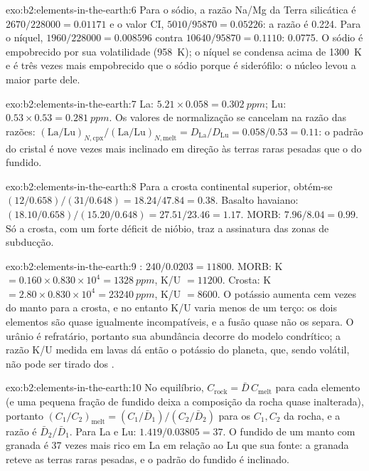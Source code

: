 \begin{solution}{exo:b2:elements-in-the-earth:6}
Para o sódio, a razão Na/Mg da Terra silicática é $2670/\num{228000} = 0.01171$ e o valor
CI, $5010/\num{95870} = 0.05226$: a razão é 0.224. Para o níquel, $1960/\num{228000}
= 0.008596$ contra $\num{10640}/\num{95870} = 0.1110$: 0.0775. O sódio é
empobrecido por sua volatilidade (\qty{958}{K}); o níquel se condensa acima de \qty{1300}{K} e é
três vezes mais empobrecido que o sódio porque é siderófilo: o núcleo levou a maior parte
dele.
\end{solution}

\begin{solution}{exo:b2:elements-in-the-earth:7}
La: $5.21\times0.058 = \qty{0.302}{ppm}$; Lu: $0.53\times0.53 = \qty{0.281}{ppm}$. Os
valores de normalização se cancelam na razão das razões:
$(\mathrm{La}/\mathrm{Lu})_{N,\mathrm{cpx}}/(\mathrm{La}/\mathrm{Lu})_{N,\mathrm{melt}} =
D_{\mathrm{La}}/D_{\mathrm{Lu}} = 0.058/0.53 = 0.11$: o padrão do cristal é nove
vezes mais inclinado em direção às terras raras pesadas que o do fundido.
\end{solution}

\begin{solution}{exo:b2:elements-in-the-earth:8}
Para a crosta continental superior, obtém-se $(12/0.658)/(31/0.648) = 18.24/47.84 = 0.38$. Basalto havaiano:
$(18.10/0.658)/(15.20/0.648) = 27.51/23.46 = 1.17$. MORB: $7.96/8.04 = 0.99$. Só a
crosta, com um forte déficit de nióbio, traz a assinatura das zonas de subducção.
\end{solution}

\begin{solution}{exo:b2:elements-in-the-earth:9}
: $240/0.0203 = \num{11800}$. MORB: K $= 0.160\times0.830\times10^4 =
\qty{1328}{ppm}$, K/U $= \num{11200}$. Crosta: K $= 2.80\times0.830\times10^4 =
\qty{23240}{ppm}$, K/U $= \num{8600}$. O potássio aumenta cem vezes do manto para a crosta,
e no entanto K/U varia menos de um terço: os dois elementos são quase igualmente incompatíveis,
e a fusão quase não os separa. O urânio é refratário, portanto sua abundância decorre
do modelo condrítico; a razão K/U medida em lavas dá então o potássio do planeta, que,
sendo volátil, não pode ser tirado dos .
\end{solution}

\begin{solution}{exo:b2:elements-in-the-earth:10}
No equilíbrio, $C_{\mathrm{rock}} = \bar D\,C_{\mathrm{melt}}$ para cada elemento (e uma
pequena fração de fundido deixa a composição da rocha quase inalterada), portanto
$(C_1/C_2)_{\mathrm{melt}} = (C_{1}/\bar D_1)/(C_{2}/\bar D_2)$ para os $C_1,
C_2$ da rocha, e a razão é $\bar D_2/\bar D_1$. Para La e Lu: $1.419/0.03805 = 37$. O fundido
de um manto com granada é 37 vezes mais rico em La em relação ao Lu que sua fonte: a granada
reteve as terras raras pesadas, e o padrão do fundido é inclinado.
\end{solution}

